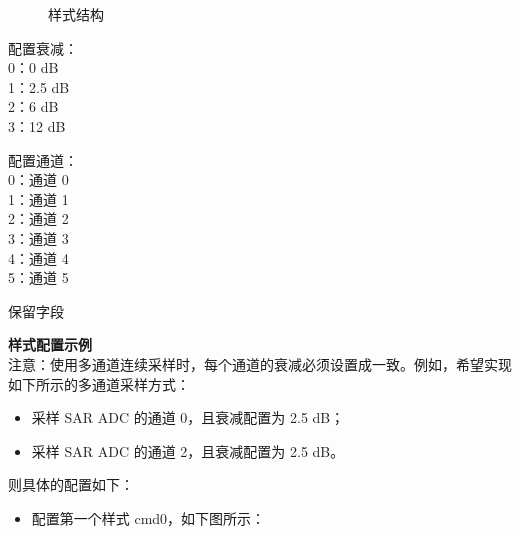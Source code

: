 \documentclass[main\_\_CN.tex]{subfiles}
\begin{document}
\begin{figure}[H]
\centering
{}%
%
%
\end{figure}
\vspace{-2em}
\begin{figure}[H]
    \centering
    \caption{样式结构}
    \label{fig:adc-pattern-table-entry}
\end{figure}
\vspace{-2em}
\begin{regdesc}\begin{reglist}
\item [atten] 配置衰减：\\
0：0 dB\\
1：2.5 dB\\
2：6 dB\\
3：12 dB
\item [ch\_sel] 配置通道：\\
0：通道 0 \\
1：通道 1 \\
2：通道 2 \\
3：通道 3 \\
4：通道 4 \\
5：通道 5 \\
\item [(reserved)] 保留字段
\end{reglist}\end{regdesc}

\textbf{样式配置示例} \\
注意：使用多通道连续采样时，每个通道的衰减必须设置成一致。例如，希望实现如下所示的多通道采样方式：
\begin{itemize}
    \item 采样 SAR ADC 的通道 0，且衰减配置为 2.5 dB；
    \item 采样 SAR ADC 的通道 2，且衰减配置为 2.5 dB。
\end{itemize}

则具体的配置如下：

\begin{itemize}
    \item 配置第一个样式 cmd0，如下图所示：

\centering
{}%
%
%
\reglabel{}\regnewline%
\begin{regdesc}\end{regdesc}
\end{itemize}
\end{document}
